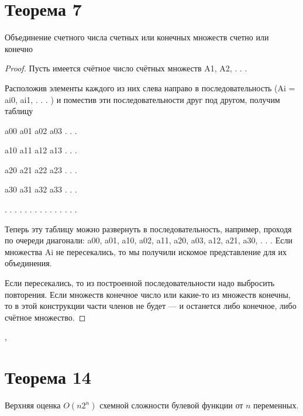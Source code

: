 \documentclass[a4paper,12pt]{article}
\begin{document}
    \section {Теорема 7}
    \begin{theorem}
   
Объединение счетного числа счетных или конечных множеств счетно или конечно
    \end{theorem}
    \begin{proof}
    
    Пусть имеется счётное число счётных множеств A1, A2, . . .
    
Расположив элементы каждого из них слева направо в последовательность (Ai = {ai0, ai1, . . . }) и поместив эти последовательности друг под другом, получим таблицу

a00 a01 a02 a03 . . .

a10 a11 a12 a13 . . .

a20 a21 a22 a23 . . .

a30 a31 a32 a33 . . .

. . . . . . . . . . . . . . .

Теперь эту таблицу можно развернуть в последовательность, например, проходя по очереди диагонали:
a00, a01, a10, a02, a11, a20, a03, a12, a21, a30, . . .
Если множества Ai не пересекались, то мы получили искомое представление для их объединения. 

Если пересекались, то из построенной последовательности надо выбросить повторения.
Если множеств конечное число или какие-то из множеств конечны, то в этой конструкции части членов не будет — и останется либо конечное, либо счётное множество.
    
    \end{proof}

    \sep
    \section{Теорема 14}
        \begin{theorem}
            Верхняя оценка $O(n2^n)$ схемной сложности булевой функции от $n$ переменных.
        \end{theorem}
\end{document}
